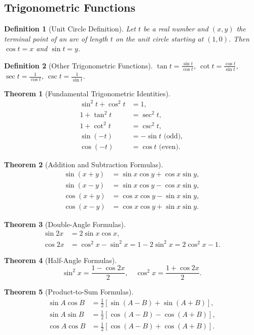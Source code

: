 \documentclass[11pt,a4paper]{article}
\newtheorem{theorem}{Theorem}
\newtheorem{definition}{Definition}
\begin{document}
\subsection{Trigonometric Functions}
\begin{definition}[Unit Circle Definition]
Let $t$ be a real number and $(x, y)$ the terminal point of an arc of length $t$ on the unit circle starting at $(1, 0)$. Then $\cos t = x$ and $\sin t = y$.
\end{definition}
\begin{definition}[Other Trigonometric Functions]
$\tan t = \frac{\sin t}{\cos t}$, $\cot t = \frac{\cos t}{\sin t}$, $\sec t = \frac{1}{\cos t}$, $\csc t = \frac{1}{\sin t}$.
\end{definition}
\begin{theorem}[Fundamental Trigonometric Identities]
\begin{align*}
\sin^2 t + \cos^2 t &= 1, \\
1 + \tan^2 t &= \sec^2 t, \\
1 + \cot^2 t &= \csc^2 t, \\
\sin(-t) &= -\sin t \text{ (odd)}, \\
\cos(-t) &= \cos t \text{ (even)}.
\end{align*}
\end{theorem}
\begin{theorem}[Addition and Subtraction Formulas]
\begin{align*}
\sin(x + y) &= \sin x \cos y + \cos x \sin y, \\
\sin(x - y) &= \sin x \cos y - \cos x \sin y, \\
\cos(x + y) &= \cos x \cos y - \sin x \sin y, \\
\cos(x - y) &= \cos x \cos y + \sin x \sin y.
\end{align*}
\end{theorem}
\begin{theorem}[Double-Angle Formulas]
\begin{align*}
\sin 2x &= 2\sin x \cos x, \\
\cos 2x &= \cos^2 x - \sin^2 x = 1 - 2\sin^2 x = 2\cos^2 x - 1.
\end{align*}
\end{theorem}
\begin{theorem}[Half-Angle Formulas]
\[
\sin^2 x = \frac{1 - \cos 2x}{2}, \quad \cos^2 x = \frac{1 + \cos 2x}{2}.
\]
\end{theorem}
\begin{theorem}[Product-to-Sum Formulas]
\begin{align*}
\sin A \cos B &= \frac{1}{2}[\sin(A-B) + \sin(A+B)], \\
\sin A \sin B &= \frac{1}{2}[\cos(A-B) - \cos(A+B)], \\
\cos A \cos B &= \frac{1}{2}[\cos(A-B) + \cos(A+B)].
\end{align*}
\end{theorem}
\end{document}
